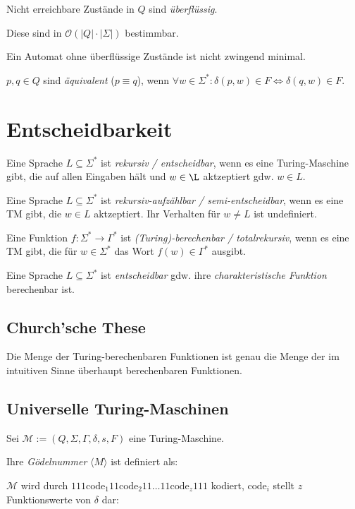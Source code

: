 Nicht erreichbare Zustände in $Q$ sind \emph{überflüssig}.

Diese sind in $\mathcal{O}(|Q|\cdot|\Sigma|)$ bestimmbar.

Ein Automat ohne überflüssige Zustände ist nicht zwingend minimal.

$p, q \in Q$ sind \emph{äquivalent} ($p \equiv q$), wenn $\forall w \in \Sigma^* : \delta(p,w) \in F \iff \delta(q,w) \in F$.

\section*{Entscheidbarkeit}

Eine Sprache $L \subseteq \Sigma^*$ ist \emph{rekursiv / entscheidbar}, wenn es eine Turing-Maschine gibt, die auf allen Eingaben hält und $w \in \L$ aktzeptiert gdw. $w \in L$.

\spacing

Eine Sprache $L \subseteq \Sigma^*$ ist \emph{rekursiv-aufzählbar / semi-entscheidbar}, wenn es eine TM gibt, die $w \in L$ aktzeptiert. Ihr Verhalten für $w \neq L$ ist undefiniert.

\spacing

Eine Funktion $f : \Sigma^* \to \Gamma^*$ ist \emph{(Turing)-berechenbar / totalrekursiv}, wenn es eine TM gibt, die für $w \in \Sigma^*$ das Wort $f(w) \in \Gamma^*$ ausgibt.

\spacing

Eine Sprache $L \subseteq \Sigma^*$ ist \emph{entscheidbar} gdw. ihre \emph{charakteristische Funktion} berechenbar ist.

\subsection*{Church'sche These}

Die Menge der Turing-berechenbaren Funktionen ist genau die Menge der im intuitiven Sinne überhaupt berechenbaren Funktionen.

\subsection*{Universelle Turing-Maschinen}

Sei $\mathcal{M} := (Q,\Sigma,\Gamma,\delta,s,F)$ eine Turing-Maschine.

Ihre \emph{Gödelnummer} $\langle M \rangle$ ist definiert als:

\spacing

$\mathcal{M}$ wird durch $111\text{code}_1 11\text{code}_2 11 \dots 11\text{code}_z 111$ kodiert, $\text{code}_i$ stellt $z$ Funktionswerte von $\delta$ dar:

